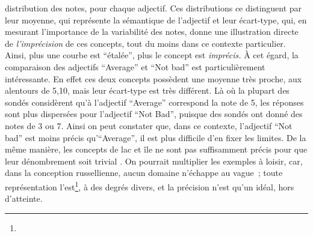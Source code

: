 distribution des notes, pour chaque adjectif. Ces distributions ce
distinguent par leur moyenne, qui représente la sémantique de
l'adjectif et leur écart-type, qui, en mesurant l'importance de la
variabilité des notes, donne une illustration directe de
\emph{l'imprécision} de ces concepts, tout du moins dans ce contexte
particulier. Ainsi, plus une courbe est \enquote{étalée}, plus le
concept est \emph{imprécis.} À cet égard, la comparaison des adjectifs
\enquote{Average} et \enquote{Not bad} est particulièrement
intéressante. En effet ces deux concepts possèdent une moyenne très
proche, aux alentours de 5,10, mais leur écart-type est très
différent. Là où la plupart des sondés considèrent qu'à l'adjectif
\enquote{Average} correspond la note de 5, les réponses sont plus
dispersées pour l'adjectif \enquote{Not Bad}, puisque des sondés ont
donné des notes de 3 ou 7. Ainsi on peut constater que, dans ce
contexte, l'adjectif \enquote{Not bad} est moins précis
qu'\enquote{Average}, il est plus difficile d'en fixer les limites.
De la même manière, les concepts de lac et île ne sont pas
suffisamment précis pour que leur dénombrement soit trivial
\autocite{Sarjakoski1996}. On pourrait multiplier les exemples à
loisir, car, dans la conception russellienne, aucun domaine n’échappe
au vague ; toute représentation l’est\footnote{}, à des degrés divers,
et la précision n’est qu’un idéal, hors d’atteinte.

